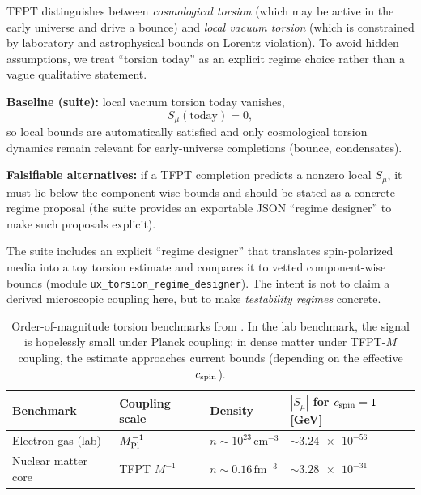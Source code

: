 TFPT distinguishes between \emph{cosmological torsion} (which may be active in the early universe and drive a bounce) and \emph{local vacuum torsion} (which is constrained by laboratory and astrophysical bounds on Lorentz violation).
To avoid hidden assumptions, we treat ``torsion today'' as an explicit regime choice rather than a vague qualitative statement.

\begin{tcolorbox}[colback=yellow!3, colframe=yellow!60!black,
    title={\textbf{Regime declaration (baseline vs.\ falsifiable alternatives)}}, fonttitle=\bfseries\small]
\textbf{Baseline (suite):} local vacuum torsion today vanishes,
\[
S_\mu(\text{today})=0,
\]
so local bounds are automatically satisfied and only cosmological torsion dynamics remain relevant for early-universe completions (bounce, condensates).

\textbf{Falsifiable alternatives:} if a TFPT completion predicts a nonzero local $S_\mu$, it must lie below the component-wise bounds and should be stated as a concrete regime proposal (the suite provides an exportable JSON ``regime designer'' to make such proposals explicit).
\end{tcolorbox}

\TFPTTorsionBoundsTable

\begin{tcolorbox}[colback=gray!5, colframe=gray!60,
    title={\textbf{Two concrete torsion test benchmarks (suite; regime designer)}}, fonttitle=\bfseries\small]
The suite includes an explicit ``regime designer'' that translates spin-polarized media into a toy torsion estimate and compares it to vetted component-wise bounds (module \texttt{ux\_torsion\_regime\_designer}). 
The intent is not to claim a derived microscopic coupling here, but to make \emph{testability regimes} concrete.
\end{tcolorbox}

\begin{table}[H]
\centering
\begin{tabular}{@{}llll@{}}
\toprule
\textbf{Benchmark} & \textbf{Coupling scale} & \textbf{Density} & \textbf{$|S_\mu|$ for $c_{\rm spin}=1$ [GeV]} \\
\midrule
Electron gas (lab) & $M_{\rm Pl}^{-1}$ & $n\sim 10^{23}\,\mathrm{cm^{-3}}$ & $\sim \num{3.24e-56}$ \\
Nuclear matter core & TFPT $M^{-1}$ & $n\sim 0.16\,\mathrm{fm^{-3}}$ & $\sim \num{3.28e-31}$ \\
\bottomrule
\end{tabular}
\caption{Order-of-magnitude torsion benchmarks from . In the lab benchmark, the signal is hopelessly small under Planck coupling; in dense matter under TFPT-$M$ coupling, the estimate approaches current bounds (depending on the effective $c_{\rm spin}$).}
\end{table}

